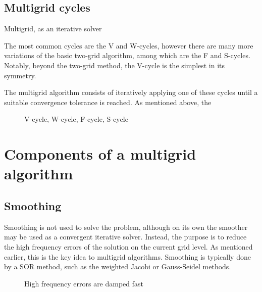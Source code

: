 
\subsection{Multigrid cycles}

Multigrid, as an iterative solver

The most common cycles are the V and W-cycles, however there are many more variations of the basic two-grid algorithm, among which are the F and S-cycles.
Notably, beyond the two-grid method, the V-cycle is the simplest in its symmetry.

The multigrid algorithm consists of iteratively applying one of these cycles until a suitable convergence tolerance is reached.
As mentioned above, the 



\begin{figure}
	\caption{V-cycle, W-cycle, F-cycle, S-cycle}
\end{figure}









\section{Components of a multigrid algorithm}

\subsection{Smoothing}

Smoothing is not used to solve the problem, although on its own the smoother may be used as a convergent iterative solver.
Instead, the purpose is to reduce the high frequency errors of the solution on the current grid level.
As mentioned earlier, this is the key idea to multigrid algorithms.
Smoothing is typically done by a SOR method, such as the weighted Jacobi or Gauss-Seidel methods.

\begin{figure}
	\caption{High frequency errors are damped fast}
\end{figure}


